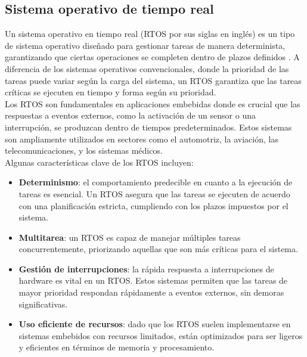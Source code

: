 \subsection{Sistema operativo de tiempo real}

Un sistema operativo en tiempo real (RTOS por sus siglas en inglés) es un tipo de sistema operativo diseñado para gestionar tareas de manera determinista, garantizando que ciertas operaciones se completen dentro de plazos definidos \cite{rtos}. A diferencia de los sistemas operativos convencionales, donde la prioridad de las tareas puede variar según la carga del sistema, un RTOS garantiza que las tareas críticas se ejecuten en tiempo y forma según su prioridad. \\

Los RTOS son fundamentales en aplicaciones embebidas donde es crucial que las respuestas a eventos externos, como la activación de un sensor o una interrupción, se produzcan dentro de tiempos predeterminados. Estos sistemas son ampliamente utilizados en sectores como el automotriz, la aviación, las telecomunicaciones, y los sistemas médicos. \\

Algunas características clave de los RTOS incluyen:

\begin{itemize}
    \item \textbf{Determinismo}: el comportamiento predecible en cuanto a la ejecución de tareas es esencial. Un RTOS asegura que las tareas se ejecuten de acuerdo con una planificación estricta, cumpliendo con los plazos impuestos por el sistema.

    \item \textbf{Multitarea}: un RTOS es capaz de manejar múltiples tareas concurrentemente, priorizando aquellas que son más críticas para el sistema.

    \item \textbf{Gestión de interrupciones}: la rápida respuesta a interrupciones de hardware es vital en un RTOS. Estos sistemas permiten que las tareas de mayor prioridad respondan rápidamente a eventos externos, sin demoras significativas.

    \item \textbf{Uso eficiente de recursos}: dado que los RTOS suelen implementarse en sistemas embebidos con recursos limitados, están optimizados para ser ligeros y eficientes en términos de memoria y procesamiento.

\end{itemize}


